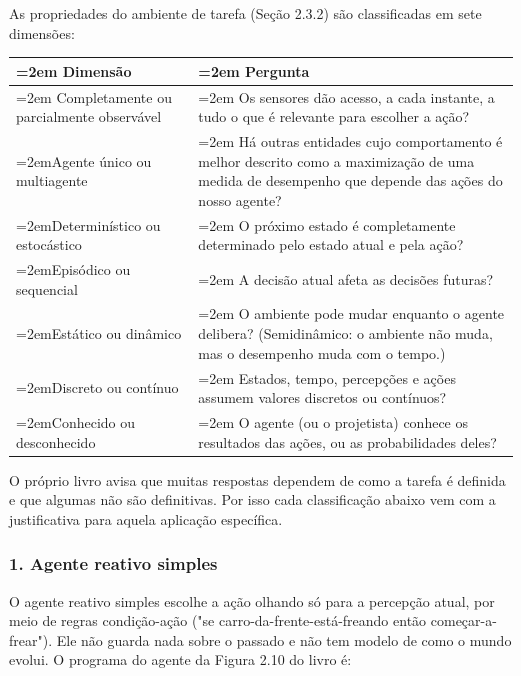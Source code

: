 \documentclass[12pt, a4paper]{article}
\begin{document}
As propriedades do ambiente de tarefa (Seção 2.3.2) são classificadas em sete dimensões:

\begingroup
\setlength{\tabcolsep}{4.0pt}
\begin{longtable}{@{}>{\raggedright\hyphenpenalty=30\tolerance=999\emergencystretch=2em\arraybackslash}p{3.90cm}>{\raggedright\hyphenpenalty=30\tolerance=999\emergencystretch=2em\arraybackslash}p{11.10cm}@{}}
\toprule\noalign{}
Dimensão & Pergunta \\
\midrule\noalign{}
\endhead
\bottomrule\noalign{}
\endlastfoot
Completamente ou parcialmente ob\-ser\-vá\-vel & Os sensores dão acesso, a cada instante, a tudo o que é relevante para escolher a ação? \\
Agente único ou multiagente & Há outras entidades cujo comportamento é melhor descrito como a ma\-xi\-mi\-za\-ção de uma medida de desempenho que depende das ações do nosso agente? \\
De\-ter\-mi\-nís\-tico ou es\-to\-cás\-tico & O próximo estado é completamente determinado pelo estado atual e pela ação? \\
Episódico ou sequencial & A decisão atual afeta as decisões futuras? \\
Estático ou dinâmico & O ambiente pode mudar enquanto o agente delibera? (Se\-mi\-di\-nâ\-mico: o ambiente não muda, mas o desempenho muda com o tempo.) \\
Discreto ou contínuo & Estados, tempo, per\-cep\-ções e ações assumem valores discretos ou contínuos? \\
Conhecido ou desconhecido & O agente (ou o projetista\allowbreak ) conhece os resultados das ações, ou as probabilidades deles? \\
\end{longtable}
\endgroup

O próprio livro avisa que muitas respostas dependem de como a tarefa é definida e que algumas não são definitivas. Por isso cada classificação abaixo vem com a justificativa para aquela aplicação específica.

\subsubsection{1. Agente reativo simples}\label{1-agente-reativo-simples}

O agente reativo simples escolhe a ação olhando só para a percepção atual, por meio de regras condição-ação ("se carro-da-frente-está-freando então começar-a-frear"). Ele não guarda nada sobre o passado e não tem modelo de como o mundo evolui. O programa do agente da Figura 2.10 do livro é:
\end{document}
